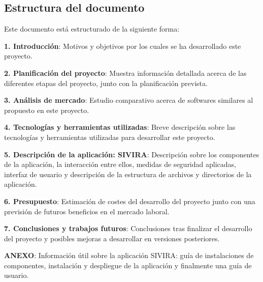 \newpage

\subsection{Estructura del documento}

Este documento está estructurado de la siguiente forma:

\textbf{1. Introducción}: Motivos y objetivos por los cuales se ha desarrollado este proyecto.

\textbf{2. Planificación del proyecto}: Muestra información detallada acerca de las diferentes etapas del proyecto, junto con la planificación prevista.

\textbf{3. Análisis de mercado}: Estudio comparativo acerca de softwares similares al propuesto en este proyecto.

\textbf{4. Tecnologías y herramientas utilizadas}: Breve descripción sobre las tecnologías y herramientas utilizadas para desarrollar este proyecto.

\textbf{5. Descripción de la aplicación: SIVIRA}: Descripción sobre los componentes de la aplicación, la interacción entre ellos, medidas de seguridad aplicadas, interfaz de usuario y descripción de la estructura de archivos y directorios de la aplicación.

\textbf{6. Presupuesto}: Estimación de costes del desarrollo del proyecto junto con una previsión de futuros beneficios en el mercado laboral.

\textbf{7. Conclusiones y trabajos futuros}: Conclusiones tras finalizar el desarrollo del proyecto y posibles mejoras a desarrollar en versiones posteriores.

\textbf{ANEXO}: Información útil sobre la aplicación SIVIRA: guía de instalaciones de componentes, instalación y despliegue de la aplicación y finalmente una guía de usuario.

\newpage

